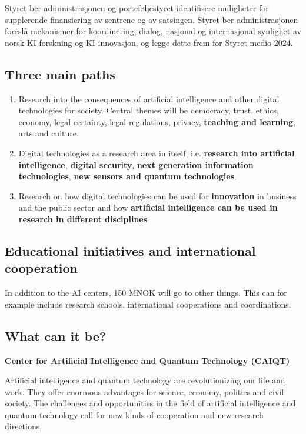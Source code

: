 \documentclass[%
oneside,                 %
final,                   %
10pt]{article}
\begin{document}
\noindent
Styret ber administrasjonen og porteføljestyret identifisere muligheter for supplerende finansiering av sentrene og av satsingen.
Styret ber administrasjonen foreslå mekanismer for koordinering, dialog, nasjonal og internasjonal synlighet av norsk KI-forskning og KI-innovasjon, og legge dette frem for Styret medio 2024.

\subsection{Three main paths}

\begin{enumerate}
\item Research into the consequences of artificial intelligence and other digital technologies for society. Central themes will be democracy, trust, ethics, economy, legal certainty, legal regulations, privacy, \textbf{teaching and learning}, arts and culture.

\item Digital technologies as a research area in itself, i.e. \textbf{research into artificial intelligence}, \textbf{digital security}, \textbf{next generation information technologies}, \textbf{new sensors and quantum technologies}.

\item Research on how digital technologies can be used for \textbf{innovation} in business and the public sector and how \textbf{artificial intelligence can be used in research in different disciplines}
\end{enumerate}

\noindent
\subsection{Educational initiatives and international cooperation}

In addition to the AI centers, 150 MNOK will go to other things. This
can for example include research schools, international cooperations
and coordinations.

\subsection{What can it be?}

\textbf{Center for Artificial Intelligence and Quantum Technology (CAIQT)}

Artificial intelligence and quantum technology are revolutionizing our
life and work. They offer enormous advantages for science, economy,
politics and civil society.
The challenges and opportunities in the field of artificial
intelligence and quantum technology call for new kinds of cooperation and new research directions.
\end{document}
